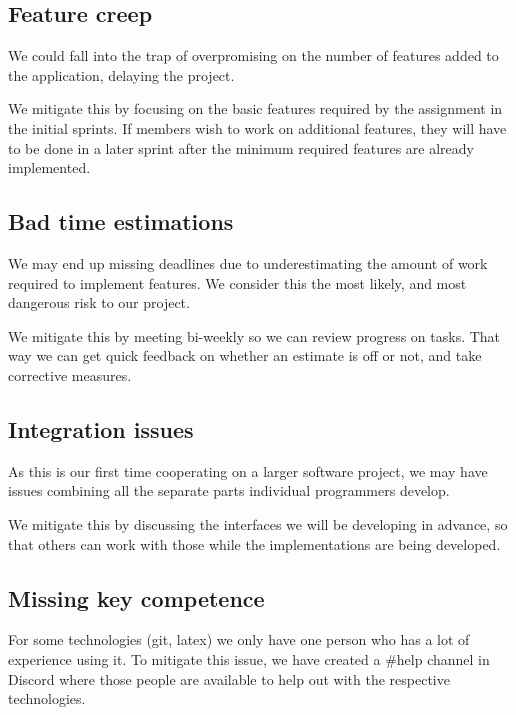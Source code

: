 \documentclass{article}
\begin{document}
\subsection*{Feature creep}

We could fall into the trap of overpromising on the number of features added to the application, delaying the project.

We mitigate this by focusing on the basic features required by the assignment in the initial sprints. If members wish to work on additional features, they will have to be done in a later sprint after the minimum required features are already implemented.

\subsection*{Bad time estimations}

We may end up missing deadlines due to underestimating the amount of work required to implement features. We consider this the most likely, and most dangerous risk to our project.

We mitigate this by meeting bi-weekly so we can review progress on tasks. That way we can get quick feedback on whether an estimate is off or not, and take corrective measures.

\subsection*{Integration issues}

As this is our first time cooperating on a larger software project, we may have issues combining all the separate parts individual programmers develop.

We mitigate this by discussing the interfaces we will be developing in advance, so that others can work with those while the implementations are being developed.

\subsection*{Missing key competence}

For some technologies (git, latex) we only have one person who has a lot of experience using it. To mitigate this issue, we have created a #help channel in Discord where those people are available to help out with the respective technologies.
\end{document}
